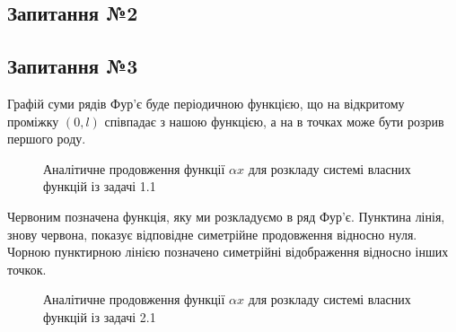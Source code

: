 \subsection*{Запитання №2}


\subsection*{Запитання №3} 
Графій суми рядів Фур'є буде періодичною функцією, що на відкритому проміжку $(0,l)$ співпадає з нашою функцією, а на в точках може бути розрив першого роду.


\begin{figure} \label{fourier1}
    \caption{Аналітичне продовження функції $\alpha x$ для розкладу системі власних функцій із задачі 1.1}
\end{figure}

Червоним позначена функція, яку ми розкладуємо в ряд Фур'є. Пунктина лінія, знову червона, показує відповідне симетрійне продовження відносно нуля. Чорною пунктирною лінією позначено симетрійні відображення відносно інших точкок.

\begin{figure} \label{fourier2}
    \caption{Аналітичне продовження функції $\alpha x$ для розкладу системі власних функцій із задачі 2.1}
\end{figure}

%
